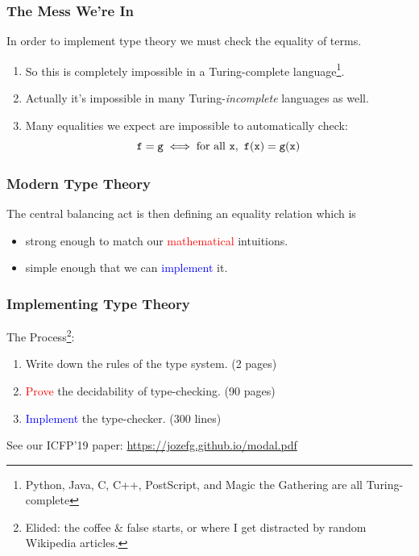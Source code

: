 \documentclass[usenames,dvipsnames,aspectratio=169,12pt]{beamer}
\begin{document}
\begin{frame}
  \frametitle{The Mess We're In}
  In order to implement type theory we must check the equality of terms.
  \begin{enumerate}
  \item So this is completely impossible in a Turing-complete language\footnote{Python, Java, C,
      C++, PostScript, and Magic the Gathering are all Turing-complete}.
  \item Actually it's impossible in many Turing-\emph{incomplete} languages as well.
  \item Many equalities we expect are impossible to automatically check:
    \[
      \mathtt{f} = \mathtt{g} \iff \text{for all } \mathtt{x},\ \mathtt{f}(\mathtt{x}) = \mathtt{g}(\mathtt{x})
    \]
  \end{enumerate}
\end{frame}

\begin{frame}
  \frametitle{Modern Type Theory}
  The central balancing act is then defining an equality relation which is
  \begin{itemize}
  \item strong enough to match our \textcolor{Red}{mathematical} intuitions.
  \item simple enough that we can \textcolor{Blue}{implement} it.
  \end{itemize}
\end{frame}

\begin{frame}
  \frametitle{Implementing Type Theory}
  The Process\footnote{Elided: the coffee \& false starts, or where I get distracted by random Wikipedia articles.}:
  \begin{enumerate}
  \item Write down the rules of the type system. \hfill (2 pages)
  \item \textcolor{Red}{Prove} the decidability of type-checking. \hfill (90 pages)
  \item \textcolor{Blue}{Implement} the type-checker. \hfill (300 lines)
  \end{enumerate}
  See our ICFP'19 paper: \url{https://jozefg.github.io/modal.pdf}
\end{frame}
\end{document}
